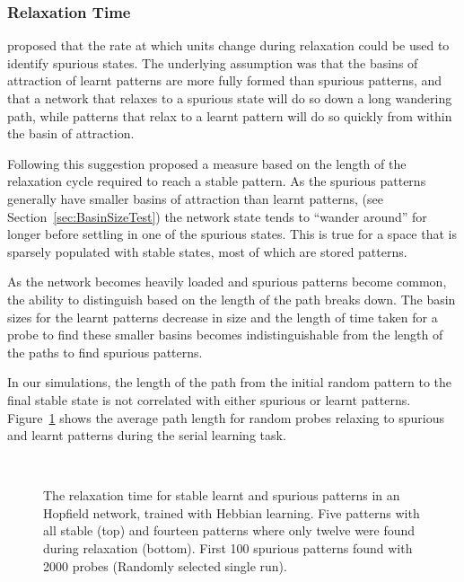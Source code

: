 \subsubsection{Relaxation Time} %
\citet{Hopfield82} proposed that the rate at which units change during relaxation could be used to identify spurious states.  The underlying assumption was that the basins of attraction of learnt patterns are more fully formed than spurious patterns, and that a network that relaxes to a spurious state will do so down a long wandering path, while patterns that relax to a learnt pattern will do so quickly from within the basin of attraction.

Following this suggestion \citet{Chengxiang2000} proposed a measure based on the length of the relaxation cycle required to reach a stable pattern.  As the spurious patterns generally have smaller basins of attraction than learnt patterns, (see Section~\ref{sec:BasinSizeTest})  the network state tends to ``wander around'' for longer before settling in one of the spurious states.  This is true for a space that is sparsely populated with stable states, most of which are stored patterns.

As the network becomes heavily loaded and spurious patterns become common, the ability to distinguish based on the length of the path breaks down.  The basin sizes for the learnt patterns decrease in size and the length of time taken for a probe to find these smaller basins becomes indistinguishable from the length of the paths to find spurious patterns.

In our simulations, the length of the path from the initial random pattern to the final stable state is not correlated with either spurious or learnt patterns.  Figure~\ref{fig:RTmeasure} shows the average path length for random probes relaxing to spurious and learnt patterns during the serial learning task.

\begin{figure}[p]
	\small
	\center
%	
	\vspace{1cm}\\
%	
	\caption{The relaxation time for stable learnt and spurious patterns in an  Hopfield network, trained with Hebbian learning.  Five patterns with all stable (top) and fourteen patterns where only twelve were found during relaxation (bottom). First 100 spurious patterns found with 2000 probes (Randomly selected single run).}
	\label{fig:RTmeasure}
\end{figure}


